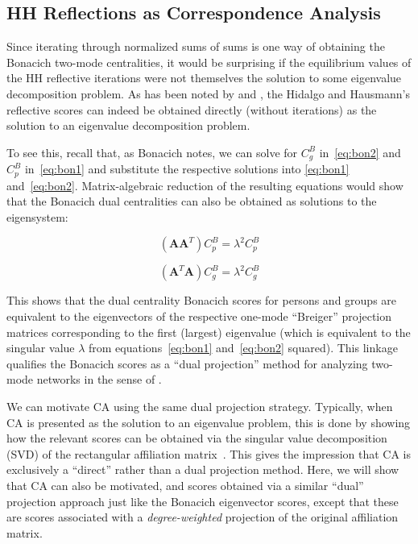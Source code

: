 \documentclass[a4paper,fleqn]{cas-sc}
\begin{document}
\subsection{HH Reflections as Correspondence Analysis} \label{subsec:refeigen}
Since iterating through normalized sums of sums is one way of obtaining the Bonacich two-mode centralities, it would be surprising if the equilibrium values of the HH reflective iterations were not themselves the solution to some eigenvalue decomposition problem. As has been noted by \citet{mealy2019interpreting} and \citet{van2021correspondence}, the Hidalgo and Hausmann's \citeyearpar{hidalgo2009building} reflective scores can indeed be obtained directly (without iterations) as the solution to an eigenvalue decomposition problem. 

To see this, recall that, as Bonacich \citeyearpar[157]{bonacich1991simultaneous} notes, we can solve for $C^B_g$ in~\ref{eq:bon2} and $C^B_p$ in~\ref{eq:bon1} and substitute the respective solutions into \ref{eq:bon1} and~\ref{eq:bon2}. Matrix-algebraic reduction of the resulting equations would show that the Bonacich dual centralities can also be obtained as solutions to the eigensystem:

\begin{equation}
    \left(\mathbf{AA}^T\right)C^B_p = \lambda^2 C^B_p
    \label{eq:bon3}
\end{equation}

\begin{equation}
    \left(\mathbf{A}^T\mathbf{A}\right)C^B_g = \lambda^2 C^B_g
    \label{eq:bon4}
\end{equation}

This shows that the dual centrality Bonacich scores for persons and groups are equivalent to the eigenvectors of the respective one-mode ``Breiger'' \citeyearpar{breiger1974duality} projection matrices corresponding to the first (largest) eigenvalue (which is equivalent to the singular value $\lambda$ from equations~\ref{eq:bon1} and~\ref{eq:bon2} squared). This linkage qualifies the Bonacich scores as a ``dual projection'' method for analyzing two-mode networks in the sense of \citet{everett2013dual}.

We can motivate CA using the same dual projection strategy. Typically, when CA is presented as the solution to an eigenvalue problem, this is done by showing how the relevant scores can be obtained via the singular value decomposition (SVD) of the rectangular affiliation matrix~\citep{borgatti1997network, bonacich1991simultaneous, faust1997centrality, faust2005using}. This gives the impression that CA is exclusively a ``direct'' rather than a dual projection method. Here, we will show that CA can also be motivated, and scores obtained via a similar ``dual'' projection approach just like the Bonacich eigenvector scores, except that these are scores associated with a \textit{degree-weighted} projection of the original affiliation matrix.
\end{document}
